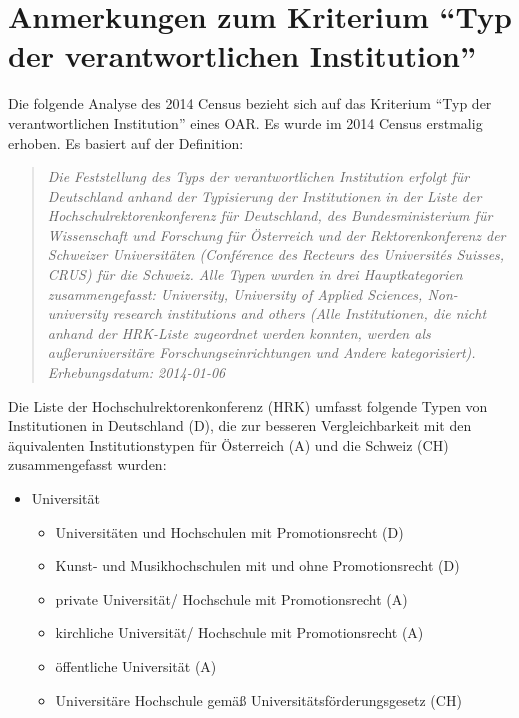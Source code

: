 \documentclass[a4paper,
fontsize=11pt,
oneside,
numbers=noperiodatend,
parskip=half-,
bibliography=totoc,
final
]{scrartcl}
\begin{document}
\section*{Anmerkungen zum Kriterium \enquote{Typ der
verantwortlichen
Institution}}\label{anmerkungen-zum-kriterium-typ-der-verantwortlichen-institution}

Die folgende Analyse des 2014 Census bezieht sich auf das Kriterium
\enquote{Typ der verantwortlichen Institution} eines OAR. Es wurde im
2014 Census erstmalig erhoben. Es basiert auf der Definition:

\begin{quote}
\emph{Die Feststellung des Typs der verantwortlichen Institution erfolgt
für Deutschland anhand der Typisierung der Institutionen in der Liste
der Hochschulrektorenkonferenz für Deutschland, des Bundesministerium
für Wissenschaft und Forschung für Österreich und der Rektorenkonferenz
der Schweizer Universitäten (Conférence des Recteurs des Universités
Suisses, CRUS) für die Schweiz. Alle Typen wurden in drei
Hauptkategorien zusammengefasst: University, University of Applied
Sciences, Non-university research institutions and others (Alle
Institutionen, die nicht anhand der HRK-Liste zugeordnet werden konnten,
werden als außeruniversitäre Forschungseinrichtungen und Andere
kategorisiert). Erhebungsdatum: 2014-01-06}
\end{quote}

Die Liste der Hochschulrektorenkonferenz (HRK) umfasst folgende Typen
von Institutionen in Deutschland (D), die zur besseren Vergleichbarkeit
mit den äquivalenten Institutionstypen für Österreich (A) und die
Schweiz (CH) zusammengefasst wurden:

\begin{itemize}
\item
  Universität

  \begin{itemize}
  \item
    Universitäten und Hochschulen mit Promotionsrecht (D)
  \item
    Kunst- und Musikhochschulen mit und ohne Promotionsrecht (D)
  \item
    private Universität/ Hochschule mit Promotionsrecht (A)
  \item
    kirchliche Universität/ Hochschule mit Promotionsrecht (A)
  \item
    öffentliche Universität (A)
  \item
    Universitäre Hochschule gemäß Universitätsförderungsgesetz (CH)
  \end{itemize}
\end{itemize}
\end{document}
